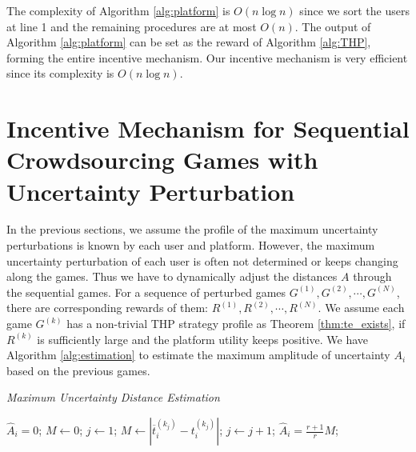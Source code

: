 \documentclass{IEEEtran}
\begin{document}
The complexity of Algorithm \ref{alg:platform} is $O(n\log n)$ since we sort the users at line 1 and the remaining procedures are at most $O(n)$. The output of Algorithm \ref{alg:platform} can be set as the reward of Algorithm \ref{alg:THP}, forming the entire incentive mechanism. Our incentive mechanism is very efficient since its complexity is $O(n\log n)$.

\section{Incentive Mechanism for Sequential Crowdsourcing Games with Uncertainty Perturbation}
\label{sec:estimation}
{\color{black}In the previous sections, we assume the profile of the maximum uncertainty perturbations is known by each user and platform.} However, the maximum uncertainty perturbation of each user is often not determined or keeps changing along the games. Thus we have to dynamically adjust the distances $A$ through the sequential games. For a sequence of perturbed games $G^{(1)},G^{(2)},\cdots,G^{(N)}$, there are corresponding rewards of them: $R^{(1)},R^{(2)},\cdots,R^{(N)}$. We assume each game $G^{(k)}$ has a non-trivial THP strategy profile as Theorem \ref{thm:te_exists}, if $R^{(k)}$ is sufficiently large and the platform utility keeps positive. We have Algorithm \ref{alg:estimation} to estimate the maximum amplitude of uncertainty $A_i$ based on the previous games.

\begin{algorithm}[!t]
\begin{small}
\caption{\emph{Maximum Uncertainty Distance Estimation}}
\label{alg:estimation}
\renewcommand{\algorithmicrequire}{\textbf{Input:}}
\renewcommand{\algorithmicensure}{\textbf{Output:}}
\begin{algorithmic}[1]
	 $\hat{A}_i=0$;
\EndIf
\State $M \leftarrow 0$; $j \leftarrow 1$;
		\label{ln:loop1}
		\State $M \leftarrow |\overline{t}_i^{(k_j)}-t_i^{(k_j)}|$;
	\EndIf
	\State $j \leftarrow j+1$;
\EndWhile		\label{ln:loop2}
 $\hat{A}_i=\frac{r+1}{r}M$;
\end{algorithmic}
\end{small}
\end{algorithm}
\end{document}
